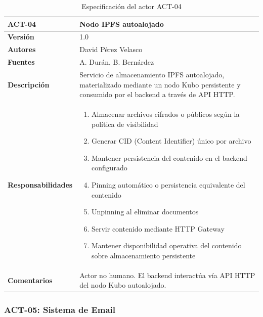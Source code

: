 \documentclass[11pt, a4paper]{article}
\begin{document}
\begin{table}[H]
    \centering
    \small
    \begin{tabular}{|p{4cm}|p{10cm}|}
    \hline
    \textbf{ACT-04} & Nodo IPFS autoalojado \\
    \hline
    \textbf{Versión} & 1.0 \\
    \hline
    \textbf{Autores} & David Pérez Velasco \\
    \hline
    \textbf{Fuentes} & A. Durán, B. Bernárdez \\
    \hline
    \textbf{Descripción} & Servicio de almacenamiento IPFS autoalojado, materializado mediante un nodo Kubo persistente y consumido por el backend a través de API HTTP. \\
    \hline
    \textbf{Responsabilidades} & 
    \begin{enumerate}
        \item Almacenar archivos cifrados o públicos según la política de visibilidad
        \item Generar CID (Content Identifier) único por archivo
        \item Mantener persistencia del contenido en el backend configurado
        \item Pinning automático o persistencia equivalente del contenido
        \item Unpinning al eliminar documentos
        \item Servir contenido mediante HTTP Gateway
        \item Mantener disponibilidad operativa del contenido sobre almacenamiento persistente
    \end{enumerate} \\
    \hline
    \textbf{Comentarios} & Actor no humano. El backend interactúa vía API HTTP del nodo Kubo autoalojado. \\
    \hline
    \end{tabular}
    \caption{Especificación del actor ACT-04}
\end{table}

\subsubsection{ACT-05: Sistema de Email}
\end{document}
